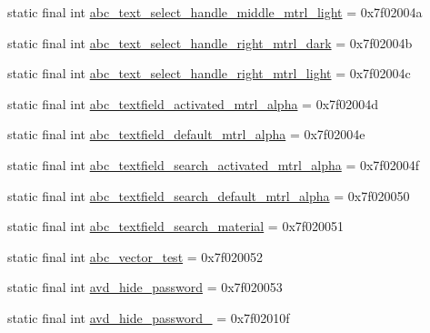 \begin{CompactItemize}
\item 
static final int \hyperlink{classandroid_1_1support_1_1graphics_1_1drawable_1_1animated_1_1_r_1_1drawable_93f18fd9ee8e4e115302149bec2a1986}{abc\_\-text\_\-select\_\-handle\_\-middle\_\-mtrl\_\-light} = 0x7f02004a
\item 
static final int \hyperlink{classandroid_1_1support_1_1graphics_1_1drawable_1_1animated_1_1_r_1_1drawable_fe17df46efc1cc62ca4e85edfce5979e}{abc\_\-text\_\-select\_\-handle\_\-right\_\-mtrl\_\-dark} = 0x7f02004b
\item 
static final int \hyperlink{classandroid_1_1support_1_1graphics_1_1drawable_1_1animated_1_1_r_1_1drawable_bcd4a514ec132a25a27804fb8982674a}{abc\_\-text\_\-select\_\-handle\_\-right\_\-mtrl\_\-light} = 0x7f02004c
\item 
static final int \hyperlink{classandroid_1_1support_1_1graphics_1_1drawable_1_1animated_1_1_r_1_1drawable_b48fc0ea27a6c2ca9d051bf2bf8be7de}{abc\_\-textfield\_\-activated\_\-mtrl\_\-alpha} = 0x7f02004d
\item 
static final int \hyperlink{classandroid_1_1support_1_1graphics_1_1drawable_1_1animated_1_1_r_1_1drawable_1b55c792bd566b9a873c0bdfbd16b459}{abc\_\-textfield\_\-default\_\-mtrl\_\-alpha} = 0x7f02004e
\item 
static final int \hyperlink{classandroid_1_1support_1_1graphics_1_1drawable_1_1animated_1_1_r_1_1drawable_37200703a7f8744650ebfd7e87955596}{abc\_\-textfield\_\-search\_\-activated\_\-mtrl\_\-alpha} = 0x7f02004f
\item 
static final int \hyperlink{classandroid_1_1support_1_1graphics_1_1drawable_1_1animated_1_1_r_1_1drawable_7bd085248496d0a922e1c0008dfdbfe8}{abc\_\-textfield\_\-search\_\-default\_\-mtrl\_\-alpha} = 0x7f020050
\item 
static final int \hyperlink{classandroid_1_1support_1_1graphics_1_1drawable_1_1animated_1_1_r_1_1drawable_d29963c3b17b7863892b96f77711d964}{abc\_\-textfield\_\-search\_\-material} = 0x7f020051
\item 
static final int \hyperlink{classandroid_1_1support_1_1graphics_1_1drawable_1_1animated_1_1_r_1_1drawable_40cc2deb0ee540604d89627241a86264}{abc\_\-vector\_\-test} = 0x7f020052
\item 
static final int \hyperlink{classandroid_1_1support_1_1graphics_1_1drawable_1_1animated_1_1_r_1_1drawable_971f7c065f5954aa91af015f477bc5ab}{avd\_\-hide\_\-password} = 0x7f020053
\item 
static final int \hyperlink{classandroid_1_1support_1_1graphics_1_1drawable_1_1animated_1_1_r_1_1drawable_539445c1899a997029725c5d31c73bd3}{avd\_\-hide\_\-password\_} = 0x7f02010f

\end{CompactItemize}

